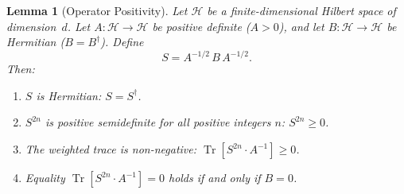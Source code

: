 \documentclass[12pt,a4paper]{article}
\theoremstyle{plain}
\newtheorem{lemma}[theorem]{Lemma}
\theoremstyle{definition}
\theoremstyle{remark}
\begin{document}
\begin{lemma}[Operator Positivity]\label{lem:op}
Let $\mathcal{H}$ be a finite-dimensional Hilbert space of dimension~$d$. Let $A:\mathcal{H}\to\mathcal{H}$ be positive definite ($A>0$), and let $B:\mathcal{H}\to\mathcal{H}$ be Hermitian ($B=B^\dagger$). Define
\begin{equation}\label{eq:Sdef}
S = A^{-1/2}\,B\,A^{-1/2}.
\end{equation}
Then:
\begin{enumerate}[label=(\alph*)]
\item $S$ is Hermitian: $S=S^\dagger$.
\item $S^{2n}$ is positive semidefinite for all positive integers $n$: $S^{2n}\geq 0$.
\item The weighted trace is non-negative: $\operatorname{Tr}[S^{2n}\cdot A^{-1}]\geq 0$.
\item Equality $\operatorname{Tr}[S^{2n}\cdot A^{-1}]=0$ holds if and only if $B=0$.
\end{enumerate}
\end{lemma}
\end{document}
